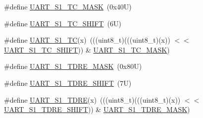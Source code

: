 \begin{DoxyCompactItemize}
\item 
\#define \mbox{\hyperlink{group___u_a_r_t___register___masks_ga8a78686c3c82eeb352b85f0699361558}{U\+A\+R\+T\+\_\+\+S1\+\_\+\+T\+C\+\_\+\+M\+A\+SK}}~(0x40\+U)
\item 
\#define \mbox{\hyperlink{group___u_a_r_t___register___masks_ga400fc3dbecf13c75447bbc006c49bdbc}{U\+A\+R\+T\+\_\+\+S1\+\_\+\+T\+C\+\_\+\+S\+H\+I\+FT}}~(6\+U)
\item 
\#define \mbox{\hyperlink{group___u_a_r_t___register___masks_ga6547a749564447be3c48693c268e0373}{U\+A\+R\+T\+\_\+\+S1\+\_\+\+TC}}(x)~(((uint8\+\_\+t)(((uint8\+\_\+t)(x)) $<$$<$ \mbox{\hyperlink{group___u_a_r_t___register___masks_ga400fc3dbecf13c75447bbc006c49bdbc}{U\+A\+R\+T\+\_\+\+S1\+\_\+\+T\+C\+\_\+\+S\+H\+I\+FT}})) \& \mbox{\hyperlink{group___u_a_r_t___register___masks_ga8a78686c3c82eeb352b85f0699361558}{U\+A\+R\+T\+\_\+\+S1\+\_\+\+T\+C\+\_\+\+M\+A\+SK}})
\item 
\#define \mbox{\hyperlink{group___u_a_r_t___register___masks_gaa7d30e83d1a7d0a544393186508a667e}{U\+A\+R\+T\+\_\+\+S1\+\_\+\+T\+D\+R\+E\+\_\+\+M\+A\+SK}}~(0x80\+U)
\item 
\#define \mbox{\hyperlink{group___u_a_r_t___register___masks_ga5c58dab9e10b6e9c41ecf6999b56ea0c}{U\+A\+R\+T\+\_\+\+S1\+\_\+\+T\+D\+R\+E\+\_\+\+S\+H\+I\+FT}}~(7\+U)
\item 
\#define \mbox{\hyperlink{group___u_a_r_t___register___masks_gac96f17340c0eafb40ca8a6688fc08a88}{U\+A\+R\+T\+\_\+\+S1\+\_\+\+T\+D\+RE}}(x)~(((uint8\+\_\+t)(((uint8\+\_\+t)(x)) $<$$<$ \mbox{\hyperlink{group___u_a_r_t___register___masks_ga5c58dab9e10b6e9c41ecf6999b56ea0c}{U\+A\+R\+T\+\_\+\+S1\+\_\+\+T\+D\+R\+E\+\_\+\+S\+H\+I\+FT}})) \& \mbox{\hyperlink{group___u_a_r_t___register___masks_gaa7d30e83d1a7d0a544393186508a667e}{U\+A\+R\+T\+\_\+\+S1\+\_\+\+T\+D\+R\+E\+\_\+\+M\+A\+SK}})
\end{DoxyCompactItemize}
